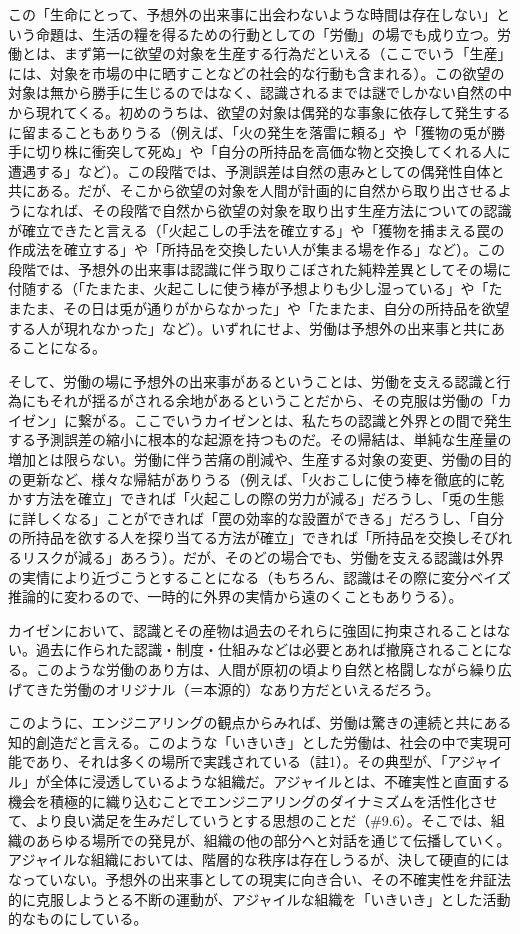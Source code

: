 この「生命にとって、予想外の出来事に出会わないような時間は存在しない」という命題は、生活の糧を得るための行動としての「労働」の場でも成り立つ。労働とは、まず第一に欲望の対象を生産する行為だといえる（ここでいう「生産」には、対象を市場の中に晒すことなどの社会的な行動も含まれる）。この欲望の対象は無から勝手に生じるのではなく、認識されるまでは謎でしかない自然の中から現れてくる。初めのうちは、欲望の対象は偶発的な事象に依存して発生するに留まることもありうる（例えば、「火の発生を落雷に頼る」や「獲物の兎が勝手に切り株に衝突して死ぬ」や「自分の所持品を高価な物と交換してくれる人に遭遇する」など）。この段階では、予測誤差は自然の恵みとしての偶発性自体と共にある。だが、そこから欲望の対象を人間が計画的に自然から取り出させるようになれば、その段階で自然から欲望の対象を取り出す生産方法についての認識が確立できたと言える（「火起こしの手法を確立する」や「獲物を捕まえる罠の作成法を確立する」や「所持品を交換したい人が集まる場を作る」など）。この段階では、予想外の出来事は認識に伴う取りこぼされた純粋差異としてその場に付随する（「たまたま、火起こしに使う棒が予想よりも少し湿っている」や「たまたま、その日は兎が通りがからなかった」や「たまたま、自分の所持品を欲望する人が現れなかった」など）。いずれにせよ、労働は予想外の出来事と共にあることになる。

そして、労働の場に予想外の出来事があるということは、労働を支える認識と行為にもそれが揺るがされる余地があるということだから、その克服は労働の「カイゼン」に繋がる。ここでいうカイゼンとは、私たちの認識と外界との間で発生する予測誤差の縮小に根本的な起源を持つものだ。その帰結は、単純な生産量の増加とは限らない。労働に伴う苦痛の削減や、生産する対象の変更、労働の目的の更新など、様々な帰結がありうる（例えば、「火おこしに使う棒を徹底的に乾かす方法を確立」できれば「火起こしの際の労力が減る」だろうし、「兎の生態に詳しくなる」ことができれば「罠の効率的な設置ができる」だろうし、「自分の所持品を欲する人を探り当てる方法が確立」できれば「所持品を交換しそびれるリスクが減る」あろう）。だが、そのどの場合でも、労働を支える認識は外界の実情により近づこうとすることになる（もちろん、認識はその際に変分ベイズ推論的に変わるので、一時的に外界の実情から遠のくこともありうる）。

カイゼンにおいて、認識とその産物は過去のそれらに強固に拘束されることはない。過去に作られた認識・制度・仕組みなどは必要とあれば撤廃されることになる。このような労働のあり方は、人間が原初の頃より自然と格闘しながら繰り広げてきた労働のオリジナル（＝本源的）なあり方だといえるだろう。

このように、エンジニアリングの観点からみれば、労働は驚きの連続と共にある知的創造だと言える。このような「いきいき」とした労働は、社会の中で実現可能であり、それは多くの場所で実践されている（註1）。その典型が、「アジャイル」が全体に浸透しているような組織だ。アジャイルとは、不確実性と直面する機会を積極的に織り込むことでエンジニアリングのダイナミズムを活性化させて、より良い満足を生みだしていうとする思想のことだ（\#9.6）。そこでは、組織のあらゆる場所での発見が、組織の他の部分へと対話を通じて伝播していく。アジャイルな組織においては、階層的な秩序は存在しうるが、決して硬直的にはなっていない。予想外の出来事としての現実に向き合い、その不確実性を弁証法的に克服しようとる不断の運動が、アジャイルな組織を「いきいき」とした活動的なものにしている。

